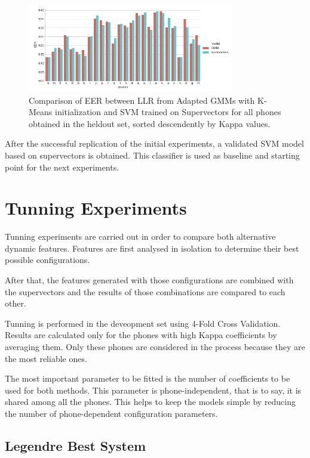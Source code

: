 \begin{figure}[H]
	\centering
	\includegraphics[width=0.8\textwidth]{files/figures/results/gmm-vs-supervectors/gmm-vs-supervectors-heldout.png}
	\caption{Comparison of EER between LLR from Adapted GMMs with K-Means initialization
	and SVM trained on Supervectors for all phones obtained in the heldout set, sorted descendently
	by Kappa values.}
	\label{fig:gmmSupervectorsTest}
\end{figure}

After the successful replication of the initial experiments, a validated SVM model based on
supervectors is obtained. This classifier is used as baseline and starting point for
the next experiments.

\section{Tunning Experiments}

Tunning experiments are carried out in order to compare both alternative
dynamic features. Features are first analysed in isolation to
determine their best possible configurations.

After that, the features generated with those configurations are combined with
the supervectors and the results of those combinations are compared to each other.

Tunning is performed in the deveopment set using 4-Fold Cross Validation. Results are
calculated only for the phones with high Kappa coefficients by averaging them.
Only these phones are considered in the process because they are the most reliable ones.

The most important parameter to be fitted is the number of coefficients to be used
for both methods. This parameter is phone-independent, that is to say, it is shared
among all the phones. This helps to keep
the models simple by reducing the number of phone-dependent configuration parameters.

\subsection{Legendre Best System}

